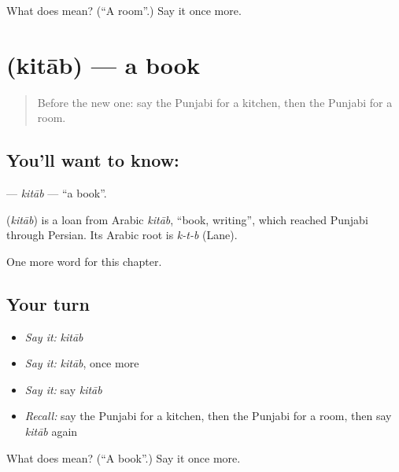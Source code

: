 \begin{tcolorbox}[breakable,colback=teal!4,colframe=teal!35!black,title={Before you move on}]
What does  mean? (\textquotedblleft{}A room\textquotedblright{}.) Say it once more.
\end{tcolorbox}
\section[\texorpdfstring{\pa{ਕਿਤਾਬ} (kitāb)}{ਕਿਤਾਬ (kitāb)}]{ (kitāb) — a book}

\label{lesson:PA-C71-kitab}



\begin{quote}
Before the new one: say the Punjabi for a kitchen, then the Punjabi for a room.
\end{quote}

\subsection*{You'll want to know: }
\textbf{} — \emph{kitāb} — \textquotedblleft{}a book\textquotedblright{}.

\begin{cousinweb}
\textbf{} (\emph{kitāb}) is a loan from Arabic \emph{kitāb}, \textquotedblleft{}book, writing\textquotedblright{}, which reached Punjabi through Persian. Its Arabic root is \emph{k-t-b} (Lane).
\end{cousinweb}

\begin{grammarlens}[title={What you've built}]
One more word for this chapter.
\end{grammarlens}

\subsection*{Your turn}
\begin{itemize}
\raggedright
  \item \emph{Say it:} \emph{kitāb}
  \item \emph{Say it:} \emph{kitāb}, once more
  \item \emph{Say it:} say \emph{kitāb}
  \item \emph{Recall:} say the Punjabi for a kitchen, then the Punjabi for a room, then say \emph{kitāb} again
\end{itemize}

\begin{tcolorbox}[breakable,colback=teal!4,colframe=teal!35!black,title={Before you move on}]
What does  mean? (\textquotedblleft{}A book\textquotedblright{}.) Say it once more.
\end{tcolorbox}
